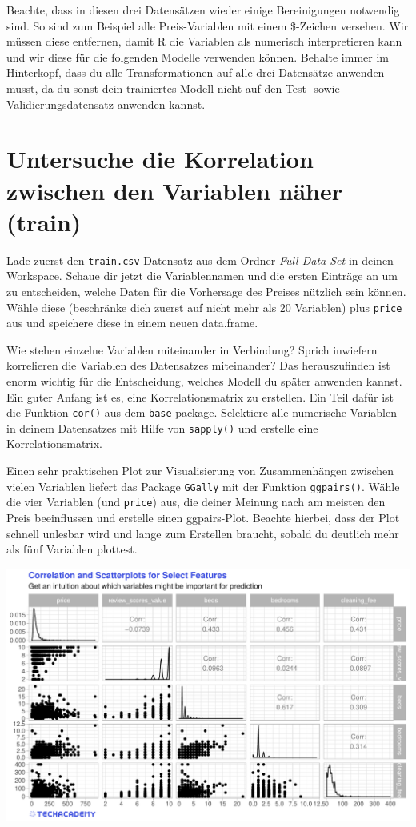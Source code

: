 \documentclass[
]{book}
\begin{document}
Beachte, dass in diesen drei Datensätzen wieder einige Bereinigungen notwendig sind.
So sind zum Beispiel alle Preis-Variablen mit einem \$-Zeichen versehen.
Wir müssen diese entfernen, damit R die Variablen als numerisch interpretieren kann und wir diese für die folgenden Modelle verwenden können. Behalte immer im Hinterkopf, dass du alle Transformationen auf alle drei Datensätze anwenden musst, da du sonst dein trainiertes Modell nicht auf den Test- sowie Validierungsdatensatz anwenden kannst.

\hypertarget{untersuche-die-korrelation-zwischen-den-variablen-nuxe4her-train}{%
\section{Untersuche die Korrelation zwischen den Variablen näher (train)}\label{untersuche-die-korrelation-zwischen-den-variablen-nuxe4her-train}}

Lade zuerst den \texttt{train.csv} Datensatz aus dem Ordner \emph{Full Data Set} in deinen Workspace.
Schaue dir jetzt die Variablennamen und die ersten Einträge an um zu entscheiden, welche Daten für die Vorhersage des Preises nützlich sein können.
Wähle diese (beschränke dich zuerst auf nicht mehr als 20 Variablen) plus \texttt{price} aus und speichere diese in einem neuen data.frame.

Wie stehen einzelne Variablen miteinander in Verbindung?
Sprich inwiefern korrelieren die Variablen des Datensatzes miteinander?
Das herauszufinden ist enorm wichtig für die Entscheidung, welches Modell du später anwenden kannst.\\
Ein guter Anfang ist es, eine Korrelationsmatrix zu erstellen.
Ein Teil dafür ist die Funktion \texttt{cor()} aus dem \texttt{base} package.
Selektiere alle numerische Variablen in deinem Datensatzes mit Hilfe von \texttt{sapply()} und erstelle eine Korrelationsmatrix.

Einen sehr praktischen Plot zur Visualisierung von Zusammenhängen zwischen vielen Variablen liefert das Package \texttt{GGally} mit der Funktion \texttt{ggpairs()}.
Wähle die vier Variablen (und \texttt{price}) aus, die deiner Meinung nach am meisten den Preis beeinflussen und erstelle einen ggpairs-Plot.
Beachte hierbei, dass der Plot schnell unlesbar wird und lange zum Erstellen braucht, sobald du deutlich mehr als fünf Variablen plottest.

\includegraphics[width=1\linewidth]{plots/5_1_ggpairs}
\end{document}
